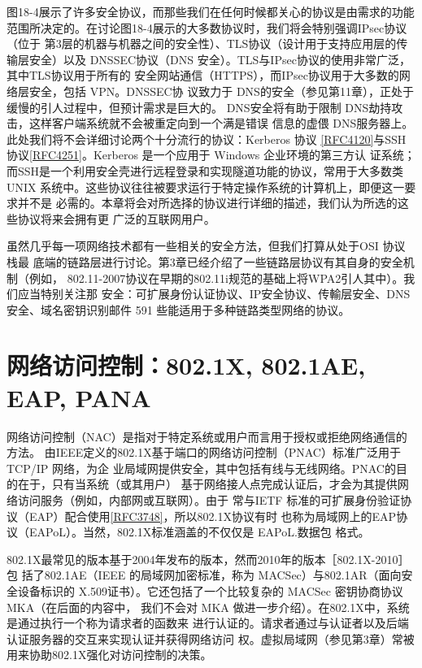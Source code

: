 图18-4展示了许多安全协议，而那些我们在任何时候都关心的协议是由需求的功能
范围所决定的。在讨论图18-4展示的大多数协议时，我们将会特别强调IPsec协议（位于
第3层的机器与机器之间的安全性）、TLS协议（设计用于支持应用层的传输层安全）以及
DNSSEC协议（DNS 安全）。TLS与IPsec协议的使用非常广泛，其中TLS协议用于所有的
安全网站通信（HTTPS），而IPsec协议用于大多数的网络层安全，包括 VPN。DNSSEC协
议致力于 DNS的安全（参见第11章），正处于缓慢的引人过程中，但预计需求是巨大的。
DNS安全将有助于限制 DNS劫持攻击，这样客户端系统就不会被重定向到一个满是错误
信息的虚偎 DNS服务器上。此处我们将不会详细讨论两个十分流行的协议：Kerberos 协议
\href{https://www.rfc-editor.org/rfc/rfc4120}{[RFC4120]}与SSH协议\href{https://www.rfc-editor.org/rfc/rfc4251}{[RFC4251]}。Kerberos 是一个应用于 Windows 企业环境的第三方认
证系统；而SSH是一个利用安全壳进行远程登录和实现隧道功能的协议，常用于大多数类
UNIX 系统中。这些协议往往被要求运行于特定操作系统的计算机上，即便这一要求并不是
必需的。本章将会对所选择的协议进行详细的描述，我们认为所选的这些协议将来会拥有更
广泛的互联网用户。

虽然几乎每一项网络技术都有一些相关的安全方法，但我们打算从处于OSI 协议栈最
底端的链路层进行讨论。第3章已经介绍了一些链路层协议有其自身的安全机制（例如，
802.11-2007协议在早期的802.11i规范的基础上将WPA2引人其中）。我们应当特别关注那
安全：可扩展身份认证协议、IP安全协议、传輸层安全、DNS 安全、域名密钥识别邮件 591
些能适用于多种链路类型网络的协议。

\section{网络访问控制：802.1X, 802.1AE, EAP, PANA}

网络访问控制（NAC）是指对于特定系统或用户而言用于授权或拒绝网络通信的方法。
由IEEE定义的802.1X基于端口的网络访问控制（PNAC）标准广泛用于 TCP/IP 网络，为企
业局域网提供安全，其中包括有线与无线网络。PNAC的目的在于，只有当系统（或其用户）
基于网络接人点完成认证后，才会为其提供网络访问服务（例如，内部网或互联网）。由于
常与IETF 标准的可扩展身份验证协议（EAP）配合使用\href{https://www.rfc-editor.org/rfc/rfc3748}{[RFC3748]}，所以802.1X协议有时
也称为局域网上的EAP协议（EAPoL）。当然，802.1X标准涵盖的不仅仅是 EAPoL.数据包
格式。

802.1X最常见的版本基于2004年发布的版本，然而2010年的版本［802.1X-2010］包
括了802.1AE（IEEE 的局域网加密标准，称为 MACSec）与802.1AR（面向安全设备标识的
X.509证书）。它还包括了一个比较复杂的 MACSec 密钥协商协议 MKA（在后面的内容中，
我们不会对 MKA 做进一步介绍）。在802.1X中，系统是通过执行一个称为请求者的函数来
进行认证的。请求者通过与认证者以及后端认证服务器的交互来实现认证并获得网络访问
权。虚拟局域网（参见第3章）常被用来协助802.1X强化对访问控制的决策。


